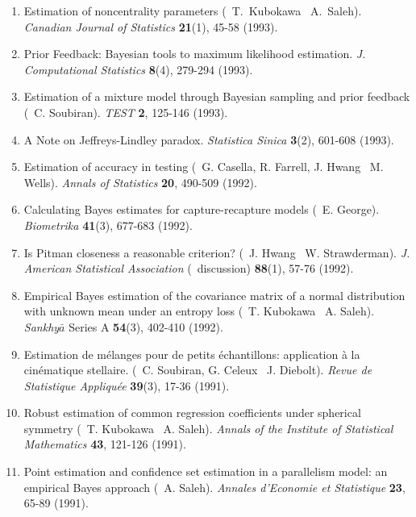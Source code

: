 \begin{enumerate}
\item Estimation of noncentrality parameters (\avec\  T.\ Kubokawa \et\ 
A.\ Saleh). {\it Canadian Journal of Statistics} {\bf 21}(1),
45-58 (1993).

\item Prior Feedback: Bayesian tools to maximum likelihood 
estimation. {\it J. Computational Statistics} {\bf 8}(4), 279-294 (1993).

\item Estimation of a mixture model through Bayesian sampling and prior feedback
(\avec\  C. Soubiran). {\it TEST} {\bf 2}, 125-146 (1993).

\item A Note on Jeffreys-Lindley paradox. {\it Statistica Sinica} 
{\bf 3}(2), 601-608 (1993).

\item Estimation of accuracy in testing 
(\avec\  G. Casella, R. Farrell, J. Hwang \et\  M. Wells).
{\it Annals of Statistics} {\bf 20}, 490-509 (1992). 

\item Calculating Bayes estimates for capture-recapture models 
(\avec\  E. George). {\it Biome\-trika} {\bf 41}(3), 677-683 (1992).

\item Is Pitman closeness a reasonable criterion? (\avec\  J. Hwang \et\ 
W. Strawderman). {\it J. American Statistical Association}
(\avec\  discussion) {\bf 88}(1), 57-76 (1992). 

\item Empirical Bayes estimation of the covariance matrix of  a normal
distribution with unknown mean under an entropy loss (\avec\  T. Kubokawa
\et\ A. Saleh).  {\it Sankhy$\bar a$} Series A {\bf 54}(3), 402-410 (1992).

\item Estimation de m\'elanges pour de petits \'echantillons: application
\`a la cin\'ematique stellaire.  (\avec\  C.  Soubiran, G. Celeux \et\  J. Diebolt).  
{\it Revue de Statistique Appliqu\'ee} {\bf 39}(3), 17-36 (1991).

\item Robust estimation of common regression coefficients under spherical
symmetry (\avec\  T. Kubokawa \et\  A. Saleh).
{\it Annals of the Institute of Statistical Mathematics\/}  {\bf 43}, 121-126 (1991).

\item Point estimation and confidence set estimation in a
parallelism model: an empirical Bayes approach (\avec\  A. Saleh).
{\it Annales d'Econo\-mie et Statistique} {\bf 23}, 65-89 (1991).


\end{enumerate}
